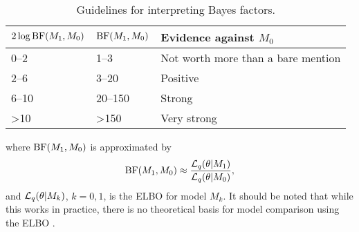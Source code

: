 \begin{table}[H]
  \centering
  \caption{Guidelines for interpreting Bayes factors.}
  \label{tab:bf}
  \begin{tabular}{lll}
    \toprule
    $2\log \operatorname{BF}(M_1,M_0)$ &$\operatorname{BF}(M_1,M_0)$ & Evidence against $M_0$ \\
    \midrule
    0--2  &1--3    &Not worth more than a bare mention \\ 
    2--6  &3--20   &Positive \\ 
    6--10 &20--150 &Strong \\ 
    >10   &>150    &Very strong \\ 
  \end{tabular}
\end{table}
\vspace{-1.4em}
\noindent where $\operatorname{BF}(M_1,M_0)$ is approximated by
\[
  \operatorname{BF}(M_1,M_0) \approx \frac{{\mathcal L}_q(\theta|M_1)}{{\mathcal L}_q(\theta|M_0)},
\]
and ${\mathcal L}_q(\theta|M_k)$, $k=0,1$, is the ELBO for model $M_k$.
It should be noted that while this works in practice, there is no theoretical basis for model comparison using the ELBO \citep{blei2017variational}.

